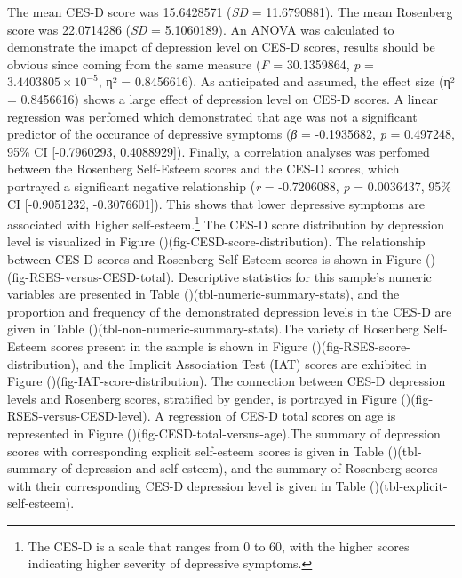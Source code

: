 \documentclass[
  man,
  floatsintext,
  longtable,
  nolmodern,
  notxfonts,
  notimes,
  colorlinks=true,linkcolor=blue,citecolor=blue,urlcolor=blue]{apa7}
\begin{document}
The mean CES-D score was 15.6428571 (\emph{SD} = 11.6790881). The mean
Rosenberg score was 22.0714286 (\emph{SD} = 5.1060189). An ANOVA was
calculated to demonstrate the imapct of depression level on CES-D
scores, results should be obvious since coming from the same measure
(\emph{F} = 30.1359864, \emph{p} = \ensuremath{3.4403805\times 10^{-5}},
η² = 0.8456616). As anticipated and assumed, the effect size (η² =
0.8456616) shows a large effect of depression level on CES-D scores. A
linear regression was perfomed which demonstrated that age was not a
significant predictor of the occurance of depressive symptoms (\emph{β}
= -0.1935682, \emph{p} = 0.497248, 95\% CI {[}-0.7960293, 0.4088929{]}).
Finally, a correlation analyses was perfomed between the Rosenberg
Self-Esteem scores and the CES-D scores, which portrayed a significant
negative relationship (\emph{r} = -0.7206088, \emph{p} = 0.0036437, 95\%
CI {[}-0.9051232, -0.3076601{]}). This shows that lower depressive
symptoms are associated with higher self-esteem.\footnote{The CES-D is a
  scale that ranges from 0 to 60, with the higher scores indicating
  higher severity of depressive symptoms.} The CES-D score distribution
by depression level is visualized in Figure
()(fig-CESD-score-distribution). The
relationship between CES-D scores and Rosenberg Self-Esteem scores is
shown in Figure
()(fig-RSES-versus-CESD-total).
Descriptive statistics for this sample's numeric variables are presented
in Table ()(tbl-numeric-summary-stats),
and the proportion and frequency of the demonstrated depression levels
in the CES-D are given in Table
()(tbl-non-numeric-summary-stats).The
variety of Rosenberg Self-Esteem scores present in the sample is shown
in Figure
()(fig-RSES-score-distribution), and
the Implicit Association Test (IAT) scores are exhibited in Figure
()(fig-IAT-score-distribution). The
connection between CES-D depression levels and Rosenberg scores,
stratified by gender, is portrayed in Figure
()(fig-RSES-versus-CESD-level). A
regression of CES-D total scores on age is represented in Figure
()(fig-CESD-total-versus-age).The
summary of depression scores with corresponding explicit self-esteem
scores is given in Table
()(tbl-summary-of-depression-and-self-esteem),
and the summary of Rosenberg scores with their corresponding CES-D
depression level is given in Table
()(tbl-explicit-self-esteem).
\end{document}
